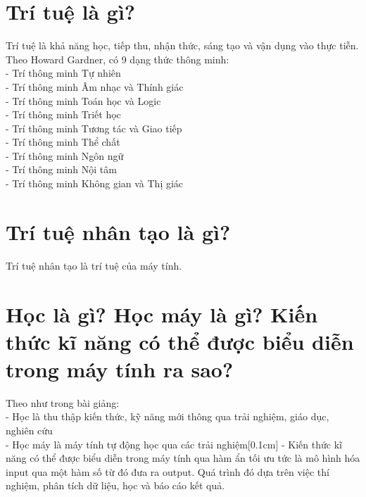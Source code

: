 \documentclass{article}
\begin{document}
\section{Trí tuệ là gì?}
Trí tuệ là khả năng học, tiếp thu, nhận thức, sáng tạo và vận dụng vào thực tiễn. \\[0.2cm]
Theo Howard Gardner, có 9 dạng thức thông minh: \\[0.2cm]
- Trí thông minh Tự nhiên \\ [0.1cm]
- Trí thông minh Âm nhạc và Thính giác \\[0.1cm]
- Trí thông minh Toán học và Logic \\[0.1cm]
- Trí thông minh Triết học \\[0.1cm]
- Trí thông minh Tương tác và Giao tiếp \\[0.1cm]
- Trí thông minh Thể chất \\[0.1cm]
- Trí thông minh Ngôn ngữ \\[0.1cm]
- Trí thông minh Nội tâm \\[0.1cm]
- Trí thông minh Không gian và Thị giác

\section{Trí tuệ nhân tạo là gì?}
Trí tuệ nhân tạo là trí tuệ của máy tính.

\section{Học là gì? Học máy là gì? Kiến thức kĩ năng có thể được biểu diễn trong máy tính ra sao?}
Theo như trong bài giảng:\\[0.2cm]
- Học là thu thập kiến thức, kỹ năng mới thông qua trải nghiệm, giáo dục, nghiên cứu\\[0.2cm]
- Học máy là máy tính tự động học qua các trải nghiệm[0.1cm]
- Kiến thức kĩ năng có thể được biểu diễn trong máy tính qua hàm ẩn tối ưu tức là mô hình hóa input qua một hàm số từ đó đưa ra output. Quá trình đó dựa trên việc thí nghiệm, phân tích dữ liệu, học và báo cáo kết quả.
\end{document}
